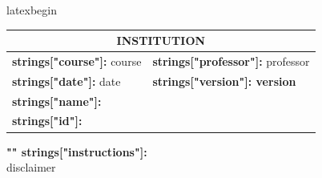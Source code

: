 \documentclass{exam}
\begin{document}
{{latexbegin}}

\begin{large}  
\begin{center}
\renewcommand{\arraystretch}{1.2}
\begin{tabularx}{0.9\linewidth}{|X|X|}
\hline
\multicolumn{2}{|c|}{\uppercase{ \bf {{institution}} }}\\ \hline
\textbf{ {{strings["course"]}}:} {{course}} &
\textbf{ {{strings["professor"]}}:} {{professor}}       \\ \hline
\textbf{ {{strings["date"]}}:} {{date}}    &
\textbf{ {{strings["version"]}}: {{version}}  }                       \\ \hline
\multicolumn{2}{|l|}{\textbf{ {{strings["name"]}}:} } \\ \hline
\multicolumn{2}{|l|}{\textbf{ {{strings["id"]}}: }   }       \\
\hline
\end{tabularx}
\end{center}
\end{large}  


\vspace{5mm}
\noindent
\textbf{{ "{" }}{{strings["instructions"]}}:}\\
{{disclaimer}}
\end{document}
